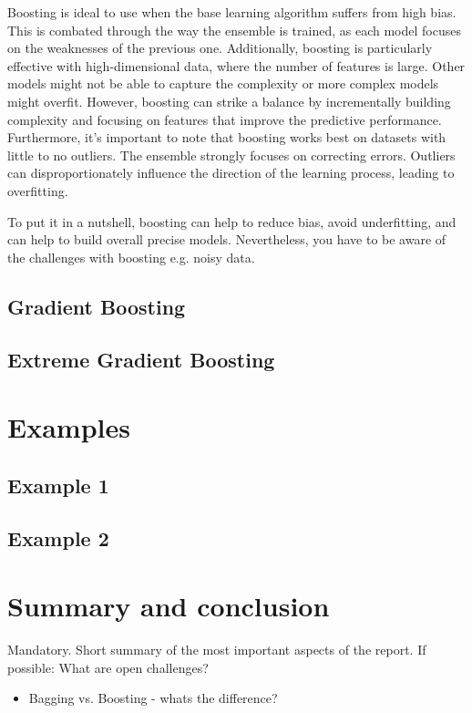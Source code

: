 Boosting is ideal to use when the base learning algorithm suffers from high bias.
This is combated through the way the ensemble is trained, as each model focuses on the
weaknesses of the previous one.
Additionally, boosting is particularly effective with high-dimensional data, where
the number of features is large. Other models might not be able to capture the 
complexity or more complex models might overfit.
However, boosting can strike a balance by incrementally building complexity and 
focusing on features that improve the predictive performance.
Furthermore, it's important to note that boosting works best on datasets with little 
to no outliers. The ensemble strongly focuses on correcting errors. Outliers can 
disproportionately influence the direction of the learning process, leading
to overfitting.


To put it in a nutshell, boosting can help to reduce bias, avoid underfitting,
and can help to build overall precise models. Nevertheless, you have to be aware
of the challenges with boosting e.g. noisy data.

\subsection{Gradient Boosting}

\subsection{Extreme Gradient Boosting}


\section{Examples}
\subsection{Example 1}
\subsection{Example 2}

\section{Summary and conclusion}
Mandatory. Short summary of the most important aspects of the report.
If possible: What are open challenges?

\begin{itemize}
    \item Bagging vs. Boosting - whats the difference?
\end{itemize}
